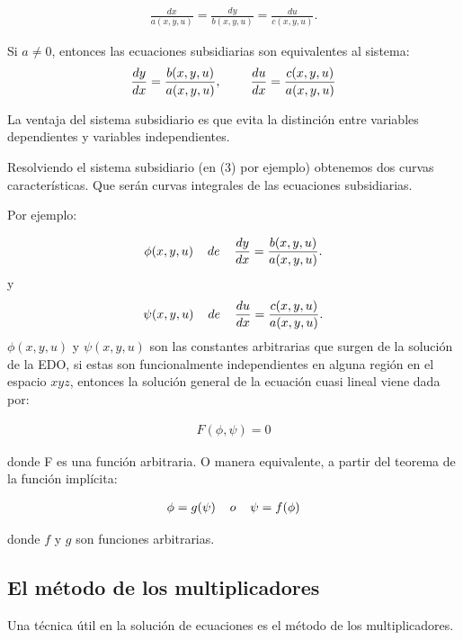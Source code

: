 \documentclass[11pt]{book}
\theoremstyle{plain}
\theoremstyle{definition}
\begin{document}
\begin{align}
    \frac{dx}{a(x,y,u)} = \frac{dy}{b(x,y,u)} = \frac{du}{c(x,y,u)}.
\end{align}

Si $a \neq 0$, entonces las ecuaciones subsidiarias son equivalentes al sistema:
\begin{align}
     \frac{dy}{dx} = \frac{b(x,y,u)}{a(x,y,u)}, \hspace{8mm} 
     \frac{du}{dx} = \frac{c(x,y,u)}{a(x,y,u)}
\end{align}

La ventaja del sistema subsidiario es que evita la distinción entre variables dependientes y variables independientes. 

Resolviendo el sistema subsidiario (en (3) por ejemplo) obtenemos dos curvas características. Que serán curvas integrales de las ecuaciones subsidiarias.

Por ejemplo:

\begin{align}
     \phi(x,y,u) \hspace{4mm}de\hspace{4mm} \frac{dy}{dx} = \frac{b(x,y,u)}{a(x,y,u)}.
\end{align}
y 
\begin{align}
     \psi(x,y,u) \hspace{4mm}de\hspace{4mm}  \frac{du}{dx} = \frac{c(x,y,u)}{a(x,y,u)}.
\end{align}
$\phi(x,y,u)$ y $\psi(x,y,u)$ son las constantes arbitrarias que surgen de la solución de la EDO, si estas son funcionalmente independientes en alguna región en el espacio $xyz$, entonces la solución general de la ecuación cuasi lineal viene dada por:

\begin{align}
    F(\phi,\psi) = 0
\end{align}

donde F es una función arbitraria. O manera equivalente, a partir del teorema de la función implícita:

\begin{align}
    \phi = g(\psi) \hspace{4mm}o\hspace{4mm} \psi = f(\phi)
\end{align}

donde $f$ y $g$ son funciones arbitrarias.

\subsection{El método de los multiplicadores}
Una técnica útil en la solución de ecuaciones es el método de los multiplicadores.
\end{document}
